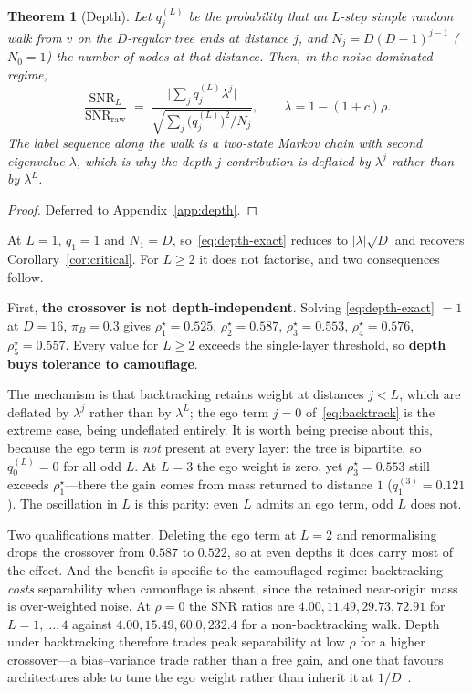 \documentclass[onecolumn,pdflatex,sn-basic,Numbered]{sn-jnl}
\theoremstyle{thmstyleone}
\newtheorem{theorem}{Theorem}
\theoremstyle{thmstylethree}
\begin{document}
\begin{theorem}[Depth]
\label{thm:depth}
Let $q^{(L)}_j$ be the probability that an $L$-step simple random walk from $v$ on
the $D$-regular tree ends at distance $j$, and $N_j = D(D-1)^{j-1}$ ($N_0=1$) the
number of nodes at that distance. Then, in the noise-dominated regime,
\begin{equation}
    \frac{\mathrm{SNR}_L}{\mathrm{SNR}_{\mathrm{raw}}}
    \;=\;
    \frac{\bigl|\sum_j q^{(L)}_j \lambda^{j}\bigr|}
         {\sqrt{\sum_j \bigl(q^{(L)}_j\bigr)^2 / N_j}},
    \qquad \lambda = 1-(1+c)\rho .
    \label{eq:depth-exact}
\end{equation}
The label sequence along the walk is a two-state Markov chain with second
eigenvalue $\lambda$, which is why the depth-$j$ contribution is deflated by
$\lambda^{j}$ rather than by $\lambda^{L}$.
\end{theorem}

\begin{proof}
Deferred to Appendix~\ref{app:depth}.
\end{proof}

At $L=1$, $q_1 = 1$ and $N_1 = D$, so~\eqref{eq:depth-exact} reduces to
$|\lambda|\sqrt D$ and recovers Corollary~\ref{cor:critical}. For $L \geq 2$ it does
not factorise, and two consequences follow.

First, \textbf{the crossover is not depth-independent}. Solving
\eqref{eq:depth-exact} $= 1$ at $D=16$, $\pi_B = 0.3$ gives
$\rho^\star_1 = 0.525$, $\rho^\star_2 = 0.587$, $\rho^\star_3 = 0.553$,
$\rho^\star_4 = 0.576$, $\rho^\star_5 = 0.557$. Every value for $L\geq2$ exceeds the
single-layer threshold, so \textbf{depth buys tolerance to camouflage}.

The mechanism is that backtracking retains weight at distances $j < L$, which are
deflated by $\lambda^{j}$ rather than by $\lambda^{L}$; the ego term $j=0$
of~\eqref{eq:backtrack} is the extreme case, being undeflated entirely. It is worth
being precise about this, because the ego term is \emph{not} present at every layer:
the tree is bipartite, so $q^{(L)}_0 = 0$ for all odd $L$. At $L=3$ the ego weight is
zero, yet $\rho^\star_3 = 0.553$ still exceeds $\rho^\star_1$---there the gain comes
from mass returned to distance $1$ ($q^{(3)}_1 = 0.121$). The oscillation in $L$ is
this parity: even $L$ admits an ego term, odd $L$ does not.

Two qualifications matter. Deleting the ego term at $L=2$ and renormalising drops the
crossover from $0.587$ to $0.522$, so at even depths it does carry most of the effect.
And the benefit is specific to the camouflaged regime: backtracking \emph{costs}
separability when camouflage is absent, since the retained near-origin mass is
over-weighted noise. At $\rho=0$ the SNR ratios are $4.00, 11.49, 29.73, 72.91$ for
$L=1,\dots,4$ against $4.00, 15.49, 60.0, 232.4$ for a non-backtracking walk. Depth
under backtracking therefore trades peak separability at low $\rho$ for a higher
crossover---a bias--variance trade rather than a free gain, and one that favours
architectures able to tune the ego weight rather than inherit it at
$1/D$~\citep{zhu2020beyond,zhu2022how}.
\end{document}
